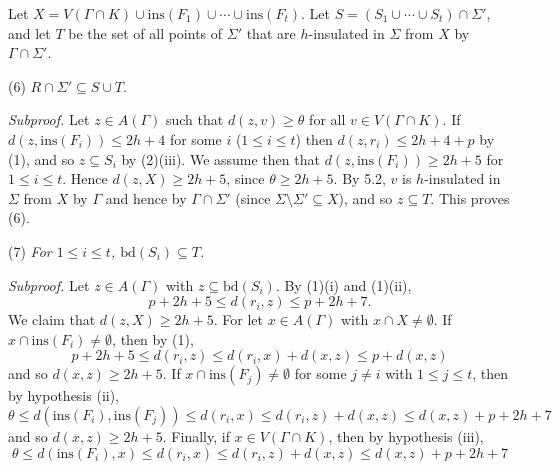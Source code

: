 Let $X = V(\Gamma \cap K) \cup \text{ins}(F_1) \cup \cdots \cup \text{ins}(F_t)$. Let $S = (S_1 \cup \cdots \cup S_t) \cap \Sigma'$, and let $T$ be the set of all points of $\Sigma'$ that are $h$-insulated in $\Sigma$ from $X$ by $\Gamma \cap \Sigma'$.

\hspace*{12pt}(6) $R \cap \Sigma' \subseteq S \cup T$.

\textit{Subproof.} Let $z \in A(\Gamma)$ such that $d(z, v) \ge \theta$ for all $v \in V(\Gamma \cap K)$. If $d(z, \text{ins}(F_i)) \le 2h + 4$ for some $i$ ($1 \le i \le t$) then $d(z, r_i) \le 2h + 4 + p$ by (1), and so $z \subseteq S_i$ by (2)(iii). We assume then that $d(z, \text{ins}(F_i)) \ge 2h + 5$ for $1 \le i \le t$. Hence $d(z, X) \ge 2h + 5$, since $\theta \ge 2h + 5$. By 5.2, $v$ is $h$-insulated in $\Sigma$ from $X$ by $\Gamma$ and hence by $\Gamma \cap \Sigma'$ (since $\Sigma \setminus \Sigma' \subseteq X$), and so $z \subseteq T$. This proves (6).

\hspace*{12pt}(7) \textit{For $1 \le i \le t$, $\text{bd}(S_i) \subseteq T$.}

\textit{Subproof.} Let $z \in A(\Gamma)$ with $z \subseteq \text{bd}(S_i)$. By (1)(i) and (1)(ii),
\begin{equation*}
p + 2h + 5 \le d(r_i, z) \le p + 2h + 7.
\end{equation*}
We claim that $d(z, X) \ge 2h + 5$. For let $x \in A(\Gamma)$ with $x \cap X \ne \emptyset$. If $x \cap \text{ins}(F_i) \ne \emptyset$, then by (1),
\begin{equation*}
p + 2h + 5 \le d(r_i, z) \le d(r_i, x) + d(x, z) \le p + d(x, z)
\end{equation*}
and so $d(x, z) \ge 2h + 5$. If $x \cap \text{ins}(F_j) \ne \emptyset$ for some $j \ne i$ with $1 \le j \le t$, then by hypothesis (ii),
\begin{equation*}
\theta \le d(\text{ins}(F_i), \text{ins}(F_j)) \le d(r_i, x) \le d(r_i, z) + d(x, z) \le d(x, z) + p + 2h + 7
\end{equation*}
and so $d(x, z) \ge 2h + 5$. Finally, if $x \in V(\Gamma \cap K)$, then by hypothesis (iii),
\begin{equation*}
\theta \le d(\text{ins}(F_i), x) \le d(r_i, x) \le d(r_i, z) + d(x, z) \le d(x, z) + p + 2h + 7
\end{equation*}
